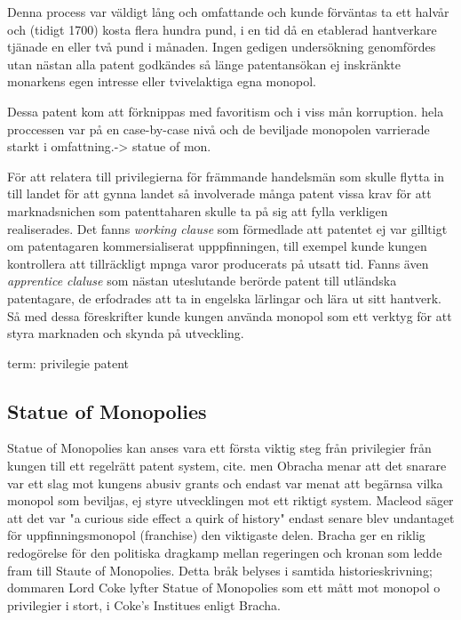 Denna process var väldigt lång och omfattande och kunde
förväntas ta ett halvår och (tidigt 1700) kosta flera hundra pund, i en tid då en etablerad hantverkare tjänade en eller två pund i månaden. \cite{macleod}
Ingen gedigen undersökning genomfördes utan nästan alla patent godkändes så
länge patentansökan ej inskränkte monarkens egen intresse eller tvivelaktiga egna monopol. 

Dessa patent kom att förknippas med favoritism och i viss mån korruption. hela proccessen var på en
case-by-case nivå och de beviljade monopolen varrierade starkt i omfattning.-> statue of mon.

För att relatera till privilegierna för främmande handelsmän som skulle flytta in till landet för att
gynna landet så involverade många patent vissa krav för att marknadsnichen som patenttaharen skulle ta på
sig att fylla verkligen realiserades. Det fanns \emph{working clause} som förmedlade att patentet ej var
gilltigt om patentagaren kommersialiserat upppfinningen, till exempel kunde kungen kontrollera att
tillräckligt mpnga varor producerats på utsatt tid. Fanns även \emph{apprentice claluse} som nästan
uteslutande berörde patent till utländska patentagare, de erfodrades att ta in engelska lärlingar och
lära ut sitt hantverk. Så med dessa föreskrifter kunde kungen använda monopol som ett verktyg för att styra marknaden och skynda på utveckling.\cite{bracha}

term: privilegie patent


\subsection{Statue of Monopolies} %
\label{sub:statue_of_monopolies}

Statue of Monopolies kan anses vara ett första viktig steg från privilegier från kungen till ett
regelrätt patent system, cite. men Obracha menar att det snarare var ett slag mot kungens abusiv grants
och endast var menat att begärnsa vilka monopol som beviljas, ej styre utvecklingen mot ett riktigt
system. Macleod \cite{macleod2} säger att det var "a curious side effect a quirk of history" endast
senare blev undantaget för uppfinningsmonopol (franchise) den viktigaste delen. Bracha ger en riklig redogörelse för den politiska dragkamp mellan regeringen och kronan som ledde fram till Staute of Monopolies. Detta bråk belyses i samtida historieskrivning; dommaren Lord Coke lyfter Statue of Monopolies som ett mått mot monopol o privilegier i stort, i Coke's Institues \cite{coke} enligt Bracha\cite{bracha}.

